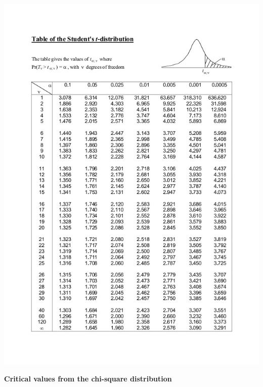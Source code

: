 \documentclass[]{book}
\begin{document}
\begin{center}\includegraphics[width=1\linewidth]{figure/ttable} \end{center}

\newpage

\textbf{Critical values from the chi-square distribution}
\end{document}
